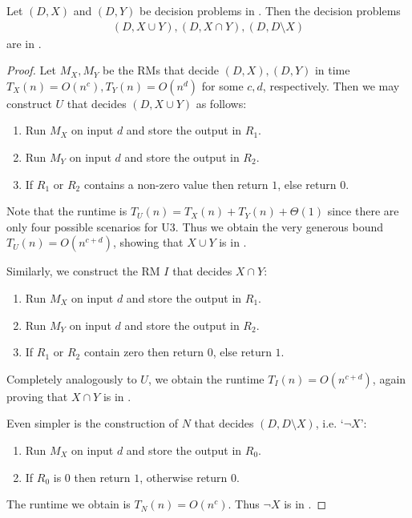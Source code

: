 \documentclass{article}
\begin{document}
\begin{claim*}[b]
	Let $(D,X)$ and $(D,Y)$ be decision problems in \ptime. Then the decision problems
	\begin{align*}
		(D,X\cup Y), (D,X\cap Y), (D,D\setminus X)
	\end{align*}
	are in \ptime.
	\begin{proof}
		Let $M_X,M_Y$ be the RMs that decide $(D,X),(D,Y)$ in time $T_X(n)=O(n^c),T_Y(n)=O(n^d)$ for some $c,d$,
		respectively. Then we may construct $U$ that decides $(D,X\cup Y)$ as follows:
		\begin{enumerate}[label=U\arabic*]
			\item Run $M_X$ on input $d$ and store the output in $R_1$.
			\item Run $M_Y$ on input $d$ and store the output in $R_2$.
			\item If $R_1$ or $R_2$ contains a non-zero value then return $1$, else return $0$.
		\end{enumerate}
		Note that the runtime is $T_U(n)=T_X(n)+T_Y(n)+\Theta(1)$ since there are only four possible scenarios
		for U3. Thus we obtain the very generous bound $T_U(n)=O(n^{c+d})$, showing that $X\cup Y$ is in \ptime.

		Similarly, we construct the RM $I$ that decides $X\cap Y$:
		\begin{enumerate}[label=I\arabic*]
			\item Run $M_X$ on input $d$ and store the output in $R_1$.
			\item Run $M_Y$ on input $d$ and store the output in $R_2$.
			\item If $R_1$ or $R_2$ contain zero then return $0$, else return $1$.
		\end{enumerate}
		Completely analogously to $U$, we obtain the runtime $T_I(n)=O(n^{c+d})$, again proving that
		$X\cap Y$ is in \ptime.

		Even simpler is the construction of $N$ that decides $(D, D\setminus X)$, i.e. `$\neg X$':
		\begin{enumerate}[label=N\arabic*]
			\item Run $M_X$ on input $d$ and store the output in $R_0$.
			\item If $R_0$ is $0$ then return $1$, otherwise return $0$.
		\end{enumerate}
		The runtime we obtain is $T_N(n)=O(n^c)$. Thus $\neg X$ is in \ptime.
	\end{proof}
\end{claim*}
\end{document}

